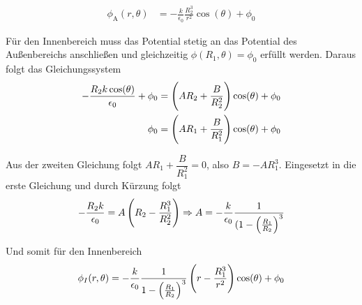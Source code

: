 \documentclass[a4paper,german,12pt,smallheadings]{scrartcl}
\begin{document}
\begin{align*}
  \phi_\text{A}(r,\theta) &= -\frac{k}{\epsilon_0} \frac{R_2^3}{r^2} \cos(\theta) + \phi_0
\end{align*}

Für den Innenbereich muss das Potential stetig an das Potential des
Außenbereichs anschließen und gleichzeitig $\phi(R_1,\theta) = \phi_0$ erfüllt
werden. Daraus folgt das Gleichungssystem
\begin{align*}
  -\frac{R_2 k \cos(\theta)}{\epsilon_0} + \phi_0 &= \del{AR_2 + \frac{B}{R_2^2}} \cos(\theta) + \phi_0 \\
                                           \phi_0 &= \del{AR_1 + \frac{B}{R_1^2}} \cos(\theta) + \phi_0
\end{align*}

Aus der zweiten Gleichung folgt $AR_1 + \dfrac{B}{R_1^2} = 0$, also $B =
-AR_1^3$. Eingesetzt in die erste Gleichung und durch Kürzung folgt
\begin{equation}
  -\frac{R_2 k}{\epsilon_0} = A \del{R_2 - \frac{R_1^3}{R_2^2}} \Rightarrow
  A = -\frac{k}{\epsilon_0} \frac{1}{(1- \del{\frac{R_1}{R_2}}^3}
\end{equation}

Und somit für den Innenbereich
\begin{equation}
  \phi_I(r, \theta) = -\frac{k}{\epsilon_0} \frac{1}{1-\del{\frac{R_1}{R_2}}^3} \del{r - \frac{R_1^3}{r^2}} \cos(\theta) + \phi_0
\end{equation}
\end{document}
